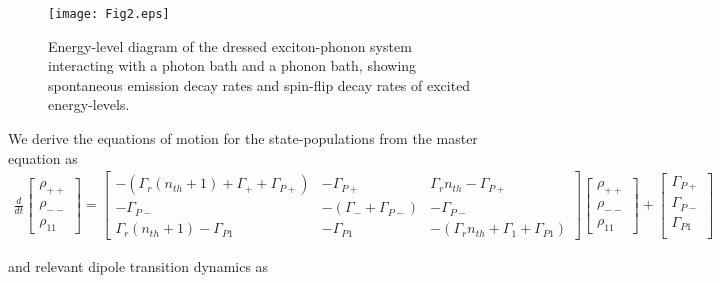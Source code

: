 \documentclass[aps,pra,preprint,groupedaddress]{revtex4-1}
\begin{document}
\begin{figure}[htbp]
\centering\texttt{[image: Fig2.eps]}
\caption{Energy-level diagram of the dressed exciton-phonon system interacting with a photon bath and a phonon bath, showing spontaneous emission decay rates and spin-flip decay rates of excited energy-levels.}
\label{Fig:DressedState_schematic}
\end{figure}

We derive the equations of motion for the state-populations from the master equation as
\begin{equation}
\label{eq:EquationofMotion_population}
\begin{aligned}
\frac{d}{dt} 
\begin{bmatrix}
\rho_{++} \\
\rho_{--} \\
\rho_{11}
\end{bmatrix} = \begin{bmatrix}
-(\Gamma_{r}(n_{th}+1)+\Gamma_{+}+\Gamma_{P+}) & -\Gamma_{P+} & \Gamma_r n_{th}-\Gamma_{P+} \\
-\Gamma_{P-} & -(\Gamma_{-}+\Gamma_{P-}) & -\Gamma_{P-} \\
\Gamma_{r}(n_{th}+1)-\Gamma_{P1} & -\Gamma_{P1} & -(\Gamma_r n_{th}+\Gamma_1+\Gamma_{P1}) 
\end{bmatrix}
\begin{bmatrix}
\rho_{++} \\
\rho_{--} \\
\rho_{11}
\end{bmatrix}+\begin{bmatrix}
\Gamma_{P+} \\
\Gamma_{P-} \\
\Gamma_{P1} \\
\end{bmatrix}
\end{aligned}
\end{equation} 

and relevant dipole transition dynamics as
\end{document}
